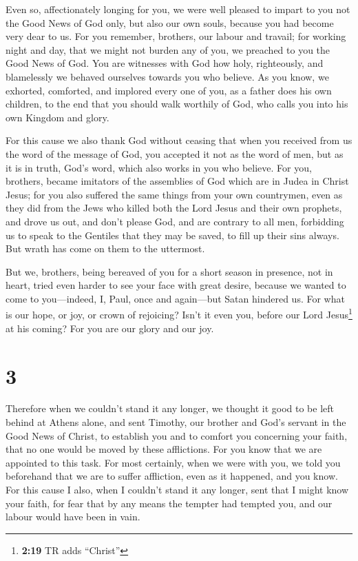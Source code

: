  Even so, affectionately longing for you, we were well
pleased to impart to you not the Good News of God only, but also our own
souls, because you had become very dear to us.  For you
remember, brothers, our labour and travail; for working night and day,
that we might not burden any of you, we preached to you the Good News of
God.  You are witnesses with God how holy, righteously,
and blamelessly we behaved ourselves towards you who believe.
 As you know, we exhorted, comforted, and implored every
one of you, as a father does his own children,  to the
end that you should walk worthily of God, who calls you into his own
Kingdom and glory.

 For this cause we also thank God without ceasing that
when you received from us the word of the message of God, you accepted
it not as the word of men, but as it is in truth, God's word, which also
works in you who believe.  For you, brothers, became
imitators of the assemblies of God which are in Judea in Christ Jesus;
for you also suffered the same things from your own countrymen, even as
they did from the Jews  who killed both the Lord Jesus
and their own prophets, and drove us out, and don't please God, and are
contrary to all men,  forbidding us to speak to the
Gentiles that they may be saved, to fill up their sins always. But wrath
has come on them to the uttermost.

 But we, brothers, being bereaved of you for a short
season in presence, not in heart, tried even harder to see your face
with great desire,  because we wanted to come to
you---indeed, I, Paul, once and again---but Satan hindered us.
 For what is our hope, or joy, or crown of rejoicing?
Isn't it even you, before our Lord Jesus\footnote{\textbf{2:19} TR adds
  ``Christ''} at his coming?  For you are our glory and
our joy.

\hypertarget{section-2}{%
\section{3}\label{section-2}}

 Therefore when we couldn't stand it any longer, we
thought it good to be left behind at Athens alone,  and
sent Timothy, our brother and God's servant in the Good News of Christ,
to establish you and to comfort you concerning your faith,
 that no one would be moved by these afflictions. For you
know that we are appointed to this task.  For most
certainly, when we were with you, we told you beforehand that we are to
suffer affliction, even as it happened, and you know.  For
this cause I also, when I couldn't stand it any longer, sent that I
might know your faith, for fear that by any means the tempter had
tempted you, and our labour would have been in vain.

